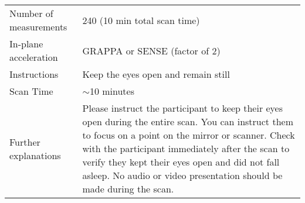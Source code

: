 \documentclass[
	a4paper, 
	11.5pt,
	headings=small, 
	twoside, 
	titlepage=firstiscover, 
 	pagesize=auto,
  	version=last,
	open=any,
	BCOR=14mm,
  	chapterprefix=false]{scrbook}
\begin{document}
\begin{table}[H]
\begin{tabularx}{1\textwidth}{@{}X *{1}{X}@{}}
Number of measurements                            			& 240 (10 min total scan time)                \\
In-plane acceleration                             				& GRAPPA or SENSE (factor of 2)               \\
Instructions                                      					& Keep the eyes open and remain still         \\
Scan Time                                         					& $\sim$10 minutes                            \\
Further explanations                              				& Please instruct the participant to keep their eyes open during the entire scan. You can instruct them to focus on a point on the mirror or scanner. Check with the participant immediately after the scan to verify they kept their eyes open and did not fall asleep. No audio or video presentation should be made during the scan.                                           
\end{tabularx}
\end{table}
\end{document}

